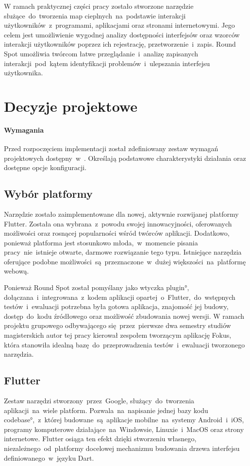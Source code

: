 W ramach praktycznej części pracy zostało stworzone narzędzie służące~do~tworzenia map cieplnych~na~podstawie interakcji użytkowników~z~programami, aplikacjami oraz stronami internetowymi. Jego celem jest umożliwienie wygodnej analizy dostępności interfejsów oraz wzorców interakcji użytkowników poprzez ich rejestrację, przetworzenie~i~zapis. Round Spot umożliwia twórcom łatwe przeglądanie~i~analizę zapisanych interakcji~pod~kątem identyfikacji problemów~i~ulepszania interfejsu użytkownika.

\section{Decyzje projektowe}

\paragraph{Wymagania} Przed rozpoczęciem implementacji został zdefiniowany zestaw wymagań projektowych dostępny~w~. Określają podstawowe charakterystyki działania oraz dostępne opcje konfiguracji.

\subsection{Wybór platformy}
Narzędzie zostało zaimplementowane dla nowej, aktywnie rozwijanej platformy Flutter. Została ona wybrana~z~powodu swojej innowacyjności, oferowanych możliwości oraz rosnącej popularności wśród twórców aplikacji. Dodatkowo, ponieważ platforma jest stosunkowo młoda,~w~momencie pisania pracy~nie~istnieje otwarte, darmowe rozwiązanie tego typu. Istniejące narzędzia oferujące podobne możliwości~są~przeznaczone~w~dużej większości~na~platformę webową.

Ponieważ Round Spot został pomyślany jako wtyczka \ang{plugin}, dołączana~i~integrowana~z~kodem aplikacji opartej~o~Flutter,~do~wstępnych testów~i~ewaluacji potrzebna była gotowa aplikacja, znajomość jej budowy, dostęp~do~kodu źródłowego oraz możliwość zbudowania nowej wersji. W ramach projektu grupowego odbywającego się~przez~pierwsze dwa semestry studiów magisterskich autor tej pracy kierował zespołem tworzącym aplikację Fokus, która stanowiła idealną bazę~do~przeprowadzenia testów~i~ewaluacji tworzonego narzędzia.

\subsection{Flutter}
Zestaw narzędzi stworzony~przez~Google, służący~do~tworzenia aplikacji~na~wiele platform. Pozwala~na~napisanie jednej bazy kodu \ang{codebase},~z~której budowane~są~aplikacje mobilne~na~systemy Android~i~iOS, programy komputerowe działające~na~Windowsie, Linuxie~i~MacOS oraz strony internetowe. Flutter osiąga ten efekt dzięki stworzeniu własnego, niezależnego~od~platformy docelowej mechanizmu budowania drzewa interfejsu definiowanego~w~języku Dart. 

